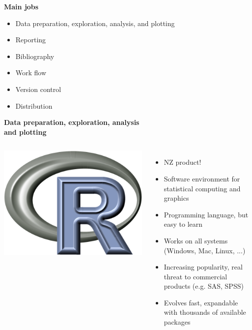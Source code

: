 \documentclass[9pt,xcolor=pdftex,dvipsnames,table]{beamer}
\begin{document}
\begin{frame}{\textbf{Main jobs}}
\begin{itemize}
\item Data preparation, exploration, analysis, and plotting
\item Reporting
\item Bibliography
\item Work flow
\item Version control
\item Distribution
\end{itemize}
\end{frame}

\begin{frame}{\textbf{Data preparation, exploration, analysis \\ and plotting}}
\begin{columns}
\centering
\includegraphics[width=1\textwidth]{images/r-logo.png}
\begin{itemize}
\item NZ product!
\item Software environment for statistical computing and graphics
\item Programming language, but easy to learn
\item Works on all systems (Windows, Mac, Linux, ...)
\item Increasing popularity, real threat to commercial products
  (e.g. SAS, SPSS)
\item Evolves fast, expandable with thousands of available packages
\end{itemize}
\end{columns}
\end{frame}
\end{document}
